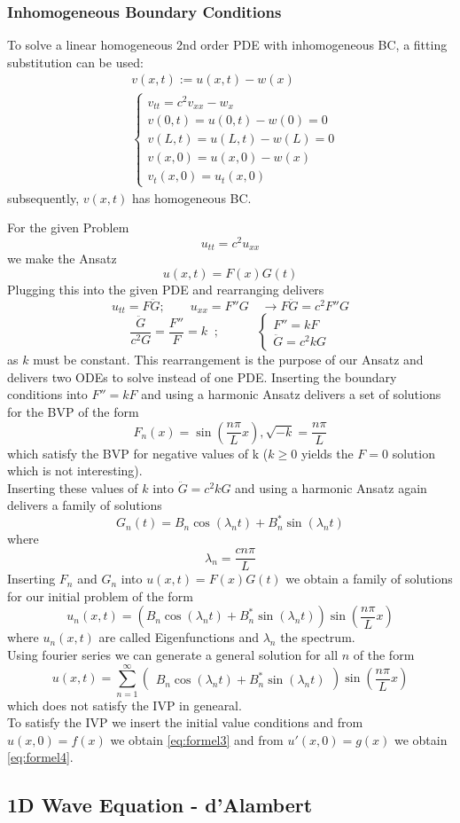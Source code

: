 \subsubsection{Inhomogeneous Boundary Conditions}
To solve a linear homogeneous 2nd order PDE with inhomogeneous BC, a fitting substitution can be used:
\begin{align*}
     & v(x,t):= u(x,t) -w(x) \\
     & \begin{cases}
           v_{tt}=c^2v_{xx}-w_x \\
           v(0,t)=u(0,t)-w(0)=0 \\
           v(L,t)=u(L,t)-w(L)=0 \\
           v(x,0)=u(x,0)-w(x)   \\
           v_t(x,0)=u_t(x,0)
       \end{cases}
\end{align*}
subsequently, $v(x,t)$ has homogeneous BC. 
%
%
\begin{examplesection}[Example]
    For the given Problem
    \[ u_{tt}=c^2u_{xx}\]
    we make the Ansatz
    \[u(x,t)=F(x)G(t)\]
    Plugging this into the given PDE and rearranging delivers
    \[u_{tt}=F\ddot{G};\qquad u_{xx}=F''G \quad \rightarrow F\ddot{G}=c^2F''G\]
    \[\frac{\ddot{G}}{c^2G}=\frac{F''}{F}=k\;\; ;\qquad\quad\begin{cases} F''=kF \\
            \ddot{G}=c^2kG
        \end{cases}\]
    as $k$ must be constant. This rearrangement is the purpose of our Ansatz and delivers two ODEs to solve instead of one PDE.
    Inserting the boundary conditions into $F''=kF$ and using a harmonic Ansatz delivers a set of solutions for the BVP of the form
    \[F_n (x)=\sin{\left( \frac{n \pi}{L} x \right) }, \sqrt{-k}=\frac{n \pi}{L}\]
    which satisfy the BVP for negative values of k ($k \ge 0$ yields the $F=0$ solution which is not interesting).\\
    Inserting these values of $k$ into $\ddot{G}=c^2kG$ and using a harmonic Ansatz again delivers a family of solutions
    \[G_n (t) =  B_n \cos{(\lambda_{n} t)} + B_n^* \sin{(\lambda_{n}t)}\]
    where
    \[ \lambda_{n} = \frac{c n \pi}{L} \]
    Inserting $F_n$ and $G_n$ into $u(x,t)=F(x)G(t)$ we obtain a family of solutions for our initial problem of the form
    \[u_n (x, t) = (B_n \cos{(\lambda_{n} t)} + B_n^* \sin{(\lambda_{n}t)})\sin{\left( \frac{n \pi}{L} x \right) } \]
    where $u_n (x, t)$ are called Eigenfunctions and $\lambda_n$ the spectrum.\\
    Using fourier series we can generate a general solution for all $n$ of the form
    \[u(x,t)=\sum\limits_{n=1}^{\infty}\begin{pmatrix}
            B_n \cos(\lambda _n t)+B_n^* \sin(\lambda_n t)
        \end{pmatrix} \sin\left(\frac{n \pi}{L}x \right) \]
    which does not satisfy the IVP in genearal.\\
    To satisfy the IVP we insert the initial value conditions and from $u(x,0)=f(x)$ we obtain \ref*{eq:formel3} and from $u'(x,0)=g(x)$ we obtain \ref*{eq:formel4}.
\end{examplesection}
\subsection{1D Wave Equation - d'Alambert}